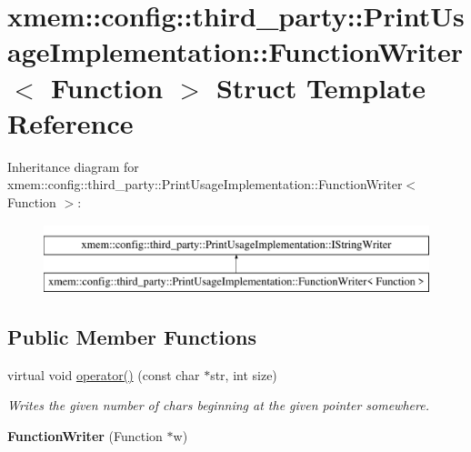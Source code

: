 \hypertarget{structxmem_1_1config_1_1third__party_1_1_print_usage_implementation_1_1_function_writer}{}\section{xmem\+:\+:config\+:\+:third\+\_\+party\+:\+:Print\+Usage\+Implementation\+:\+:Function\+Writer$<$ Function $>$ Struct Template Reference}
\label{structxmem_1_1config_1_1third__party_1_1_print_usage_implementation_1_1_function_writer}
Inheritance diagram for xmem\+:\+:config\+:\+:third\+\_\+party\+:\+:Print\+Usage\+Implementation\+:\+:Function\+Writer$<$ Function $>$\+:\begin{figure}[H]
\begin{center}
\leavevmode
\includegraphics[height=2.000000cm]{structxmem_1_1config_1_1third__party_1_1_print_usage_implementation_1_1_function_writer}
\end{center}
\end{figure}
\subsection*{Public Member Functions}
\begin{DoxyCompactItemize}
\item 
\hypertarget{structxmem_1_1config_1_1third__party_1_1_print_usage_implementation_1_1_function_writer_abe1d90cb504d65f67564b73a4b49d9ee}{}virtual void \hyperlink{structxmem_1_1config_1_1third__party_1_1_print_usage_implementation_1_1_function_writer_abe1d90cb504d65f67564b73a4b49d9ee}{operator()} (const char $\ast$str, int size)\label{structxmem_1_1config_1_1third__party_1_1_print_usage_implementation_1_1_function_writer_abe1d90cb504d65f67564b73a4b49d9ee}

\begin{DoxyCompactList}\small\item\em Writes the given number of chars beginning at the given pointer somewhere. \end{DoxyCompactList}\item 
\hypertarget{structxmem_1_1config_1_1third__party_1_1_print_usage_implementation_1_1_function_writer_af078bf1e5f1545f343dd7111364c3936}{}{\bfseries Function\+Writer} (Function $\ast$w)\label{structxmem_1_1config_1_1third__party_1_1_print_usage_implementation_1_1_function_writer_af078bf1e5f1545f343dd7111364c3936}

\end{DoxyCompactItemize}
